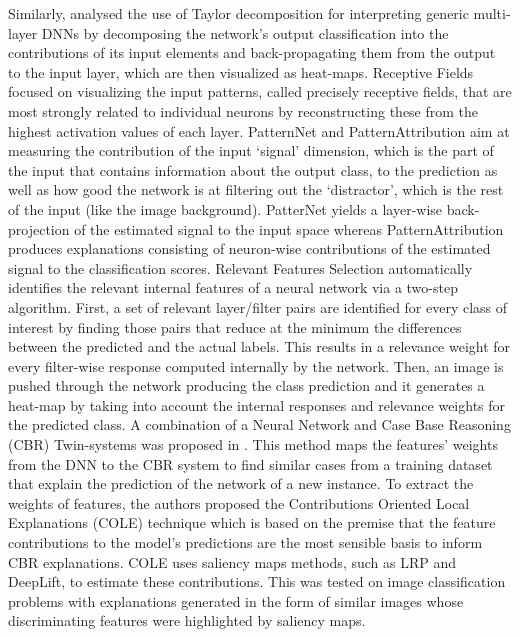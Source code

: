 \documentclass[final,1p,times]{elsarticle}
\begin{document}
Similarly, \cite{montavon2017explaining} analysed the use of Taylor decomposition for interpreting generic multi-layer DNNs by decomposing the network's output classification into the contributions of its input elements and back-propagating them from the output to the input layer, which are then visualized as heat-maps. Receptive Fields \cite{he2017deep} focused on visualizing the input patterns, called precisely receptive fields, that are most strongly related to individual neurons by reconstructing these from the highest activation values of each layer. 
PatternNet and PatternAttribution \cite{kindermans2018learning} aim at measuring the contribution of the input `signal' dimension, which is the part of the input that contains information about the output class, to the prediction as well as how good the network is at filtering out the `distractor', which is the rest of the input (like the image background). PatterNet yields a layer-wise back-projection of the estimated signal to the input space whereas PatternAttribution produces explanations consisting of neuron-wise contributions of the estimated signal to the classification scores.
Relevant Features Selection \cite{mogrovejo2019visual} automatically identifies the relevant internal features of a neural network via a two-step algorithm. First, a set of relevant layer/filter pairs are identified for every class of interest by finding those pairs that reduce at the minimum the differences between the predicted and the actual labels. This results in a relevance weight for every filter-wise response computed internally by the network. Then, an image is pushed through the network producing the class prediction and it generates a heat-map by taking into account the internal responses and relevance weights for the predicted class.
A combination of a Neural Network and Case Base Reasoning (CBR) Twin-systems was proposed in \cite{kenny2019twin}. This method maps the features' weights from the DNN to the CBR system to find similar cases from a training dataset that explain the prediction of the network of a new instance. To extract the weights of features, the authors proposed the Contributions Oriented Local Explanations (COLE) technique which is based on the premise that the feature contributions to the model's predictions are the most sensible basis to inform CBR explanations. COLE uses saliency maps methods, such as LRP and DeepLift, to estimate these contributions. This was tested on image classification problems with explanations generated in the form of similar images whose discriminating features were highlighted by saliency maps.
\end{document}
